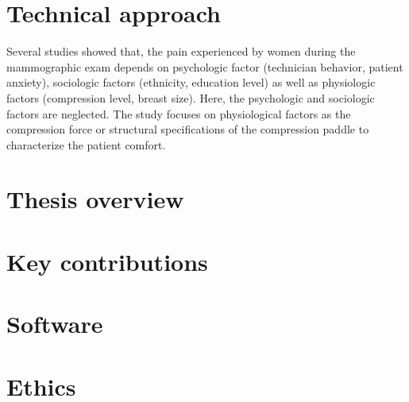 \chapter*{Technical approach}\label{section:technicalapproach}
Several studies showed that, the pain experienced by women during the mammographic exam depends on psychologic factor \citep{aro_pain_1996} (technician behavior, patient anxiety), sociologic factors \citep{dullum_rates_2000} (ethnicity, education level) as well as physiologic \citep{poulos_breast_2003} factors (compression level,  breast size). Here, the psychologic and sociologic factors are neglected. The study focuses on physiological factors as the compression force or structural specifications of the compression paddle to characterize the patient comfort. 


\chapter*{Thesis overview}\label{section:thesisoverview}
\chapter*{Key contributions}\label{section:keycontributions}
\chapter*{Software}\label{section:software}
\chapter*{Ethics}\label{section:ethics}
